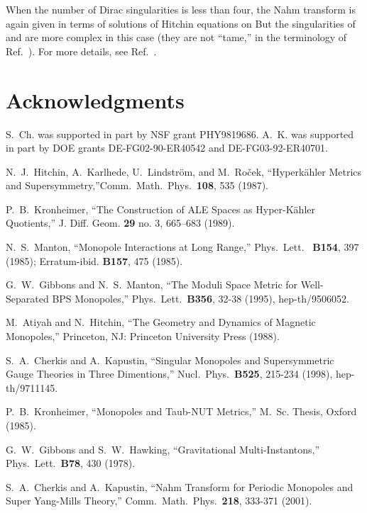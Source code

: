 \documentclass[a4paper,12pt, amsfonts, amssymb]{article}
\providecommand{\PP}{{\mathbb P}}
\providecommand{\hphi}{{\hat\phi}}
\providecommand{\hA}{{\hat A}}
\begin{document}
When the number of Dirac singularities is less than four, the Nahm transform
is again given in terms of solutions of Hitchin equations on \myHighlight{$\PP^1.$}\coordHE{}
But the singularities of \myHighlight{$\hphi$}\coordHE{} and \myHighlight{$\hA$}\coordHE{} are more complex in this case
(they are not ``tame,'' in the terminology of Ref.~\cite{Simpson}). For more
details, see Ref.~\cite{ustwo}.

\section*{Acknowledgments}
S.~Ch. was supported in part by NSF grant PHY9819686. A.~K. was supported
in part by DOE grants DE-FG02-90-ER40542 and DE-FG03-92-ER40701.

\begin{thebibliography}{99}
N.~J.~Hitchin, A.~Karlhede, U.~Lindstr\"om, and M.~Ro\v{c}ek, ``Hyperk\"ahler Metrics and Supersymmetry,''Comm.\ Math.\ Phys.\ {\bf 108}, 535 (1987).

P.~B.~Kronheimer, ``The Construction of ALE Spaces as Hyper-K\"ahler Quotients,'' J. Diff. Geom. {\bf 29}  no. 3, 665--683 (1989).

N.~S.~Manton, ``Monopole Interactions at Long Range,'' Phys.\ Lett.\ {\bf
B154}, 397 (1985); Erratum-ibid. {\bf B157}, 475 (1985).

G.~W.~Gibbons and N.~S.~Manton,
``The Moduli Space Metric for Well-Separated BPS Monopoles,''
Phys.\ Lett.\ {\bf B356}, 32-38 (1995), hep-th/9506052.

M.~Atiyah and N.~Hitchin, ``The Geometry and Dynamics of Magnetic
Monopoles,'' Princeton, NJ: Princeton University Press (1988).

S.~A.~Cherkis and A.~Kapustin, ``Singular Monopoles and Supersymmetric Gauge Theories in Three Dimentions,'' Nucl.\ Phys.\ {\bf B525}, 215-234 (1998), hep-th/9711145.

 P.~B.~Kronheimer, ``Monopoles and Taub-NUT Metrics,''
M.~Sc. Thesis, Oxford (1985).

 G.~W.~Gibbons and S.~W.~Hawking, ``Gravitational Multi-Instantons,'' Phys.\ Lett.\ {\bf B78}, 430 (1978).

S.~A.~Cherkis and A.~Kapustin, ``Nahm Transform for Periodic Monopoles
and \coordHE{} Super Yang-Mills Theory,'' Comm.\ Math.\ Phys.\ {\bf 218}, 333-371 (2001).


\end{thebibliography}
\end{document}
